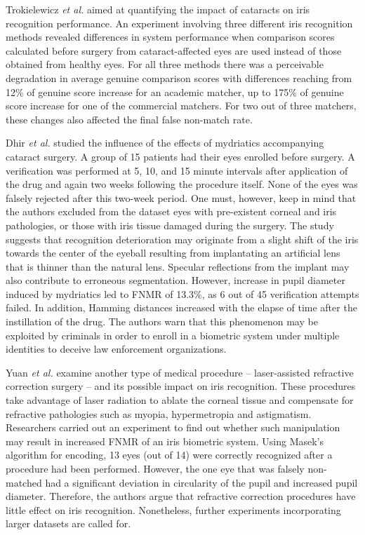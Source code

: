 \documentclass[article,12pt]{elsarticle}
\begin{document}
Trokielewicz \emph{et al.} \cite{TrokielewiczWilga2014} aimed at quantifying the impact of cataracts on iris recognition performance. An experiment involving three different iris recognition methods revealed differences in system performance when comparison scores calculated before surgery from cataract-affected eyes are used instead of those obtained from healthy eyes. For all three methods there was a perceivable degradation in average genuine comparison scores with differences reaching from 12\% of genuine score increase for an academic matcher, up to 175\% of genuine score increase for one of the commercial matchers. For two out of three matchers, these changes also affected the final false non-match rate.

Dhir \emph{et al.} \cite{Dhir} studied the influence of the effects of mydriatics accompanying cataract surgery. A group of 15 patients had their eyes enrolled before surgery. A verification was performed at 5, 10, and 15 minute intervals after application of the drug and again two weeks following the procedure itself. None of the eyes was falsely rejected after this two-week period.  One must, however, keep in mind that the authors excluded from the dataset eyes with pre-existent corneal and iris pathologies, or those with iris tissue damaged during the surgery. The study suggests that recognition deterioration may originate from a slight shift of the iris towards the center of the eyeball resulting from implantating an artificial lens that is thinner than the natural lens. Specular reflections from the implant may also contribute to erroneous segmentation. However, increase in pupil diameter induced by mydriatics led to FNMR of 13.3\%, as 6 out of 45 verification attempts failed. In addition, Hamming distances increased with the elapse of time after the instillation of the drug. The authors warn that this phenomenon may be exploited by criminals in order to enroll in a biometric system under multiple identities to deceive law enforcement organizations.

Yuan \emph{et al.} \cite{Yuan} examine another type of medical procedure -- laser-assisted refractive correction surgery -- and its possible impact on iris recognition. These procedures take advantage of laser radiation to ablate the corneal tissue and compensate for refractive pathologies such as myopia, hypermetropia and astigmatism. Researchers carried out an experiment to find out whether such manipulation may result in increased FNMR of an iris biometric system. Using Masek’s algorithm for encoding, 13 eyes (out of 14) were correctly recognized after a procedure had been performed. However, the one eye that was falsely non-matched had a significant deviation in circularity of the pupil and increased pupil diameter. Therefore, the authors argue that refractive correction procedures have little effect on iris recognition. Nonetheless, further experiments incorporating larger datasets are called for.
\end{document}
